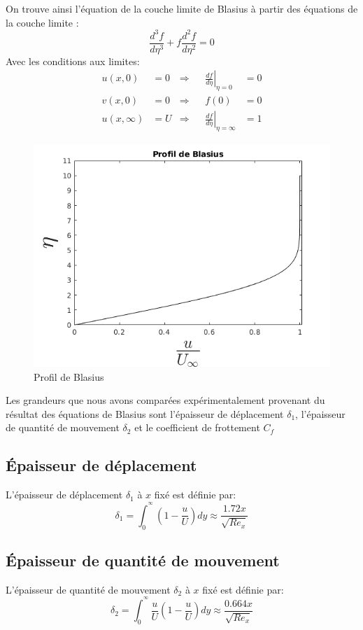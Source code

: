 On trouve ainsi l'équation de la couche limite de Blasius à partir des équations de la couche limite :
\begin{equation}	
	\frac{d^{3}f}{d\eta^{3}} + f\frac{d^{2} f}{d\eta^{2}} = 0
\end{equation}
Avec les conditions aux limites:
\begin{align}
	u(x,0) &= 0 &\Rightarrow &&
	\left.
	\frac{d f}{d \eta}     \right|_{\eta = 0} &= 0
	\\
	v(x,0) &= 0 &\Rightarrow &&
	f(0) &= 0
	\\
	u(x,\infty) &= U &\Rightarrow &&
	\left.
	\frac{d f}{d \eta} \right|_{\eta = \infty} &= 1
\end{align}
\newpage
\begin{figure}[ht]
	\centering
	\includegraphics[scale = 0.6]{./image/Blasius.png}
	\caption{Profil de Blasius}
\end{figure}
Les grandeurs que nous avons comparées expérimentalement provenant du résultat des équations de Blasius sont l'épaisseur de déplacement $\delta_{1}$, l'épaisseur de quantité de mouvement $\delta_{2}$ et le coefficient de frottement $C_{f}$
\subsection{Épaisseur de déplacement}
L'épaisseur de déplacement $\delta_{1}$ à $x$ fixé est définie par:
\begin{equation}
	\delta_{1} = 
	\int_{0}^{^\infty}
	\left(
	1 - 
	\frac{u}{U}
	\right)
	dy
	\approx \frac{1.72x}{\sqrt{Re_{x}}}
\end{equation}
\subsection{Épaisseur de quantité de mouvement}
L'épaisseur de quantité de mouvement $\delta_{2}$ à $x$ fixé est définie par:
\begin{equation}
	\delta_{2} = 
	\int_{0}^{^\infty}
	\frac{u}{U}
	\left(
	1 - 
	\frac{u}{U}
	\right)
	dy
	\approx \frac{0.664x}{\sqrt{Re_{x}}}
\end{equation}
